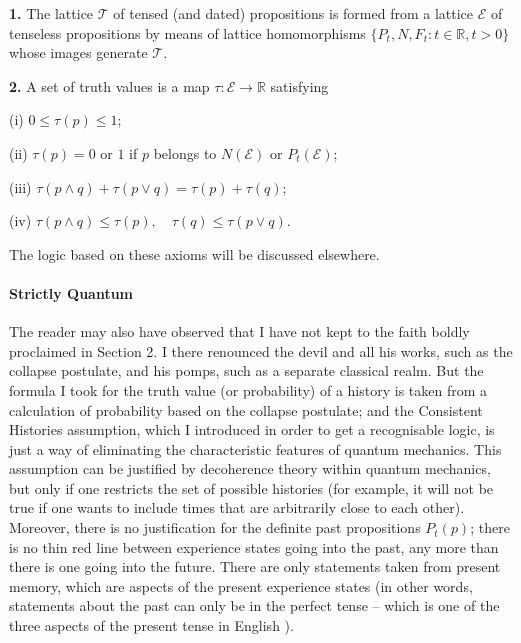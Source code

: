 \documentclass[12pt,reqno]{article}
\newcommand{\semilinespace}{\vspace{0.5\baselineskip}}
\renewcommand{\(}{\left(}
\renewcommand{\)}{\right)}
\newcommand{\R}{\mathbb{R}}
\newcommand{\E}{\mathcal{E}}
\newcommand{\T}{\mathcal{T}}
\newcommand{\<}{\langle}
\renewcommand{\>}{\rangle}
\theoremstyle{plain} %
\begin{document}
{\bf 1.} The lattice $\T$ of tensed (and dated) propositions is formed from a lattice $\E$ of tenseless propositions by means of lattice homomorphisms $\{P_t, N, F_t: t\in \R, t>0\}$ whose images generate $\T$.

{\bf 2.} A set of truth values is a map $\tau:\E\to\R$ satisfying

\semilinespace

\noindent (i) $0\le \tau(p) \le 1$;

\semilinespace

\noindent (ii) $\tau(p) = 0$ or $1$ if $p$ belongs to $N(\E)$ or $P_t(\E)$;

\semilinespace

\noindent (iii) $\tau(p\land q) + \tau(p\lor q) = \tau(p) + \tau(q)$;

\semilinespace

\noindent (iv) $\tau(p\land q) \le \tau(p), \hspace{1em} \tau(q) \le \tau(p\lor q)$.

\semilinespace
 
The logic based on these axioms will be discussed elsewhere.



\paragraph{Strictly Quantum}  The reader may also have observed that I have not kept to the faith boldly proclaimed in Section 2. I there renounced the devil and all his works, such as the collapse postulate, and his pomps, such as a separate classical realm. But the formula I took for the truth value (or probability) of a history is taken from a calculation of probability based on the collapse postulate; and the Consistent Histories assumption, which I introduced in order to   
get a recognisable logic, is just a way of eliminating the characteristic features of quantum mechanics. This assumption can be justified by decoherence theory within quantum mechanics, but only if one restricts the set of possible histories (for example, it will not be true if one wants to include times that are arbitrarily close to each other). Moreover, there is no justification for the definite past propositions $P_t(p)$; there is no thin red line between experience states going into the past, any more than there is one going into the future. There are only statements taken from present memory, which are aspects of the present experience states (in other words, statements about the past can only be in the perfect tense -- which is one of the three aspects of the present tense in English \cite{Joos}).
\end{document}
